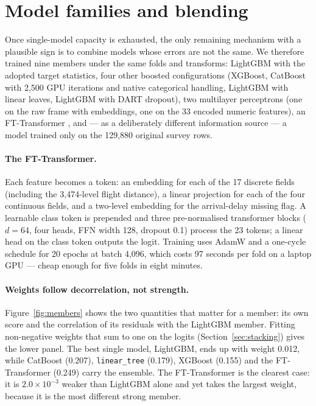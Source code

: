 \section{Model families and blending}
\label{sec:families}

Once single-model capacity is exhausted, the only remaining mechanism with a plausible sign is
to combine models whose errors are not the same. We therefore trained nine members under the
same folds and transforms: LightGBM with the adopted target statistics, four other boosted
configurations (XGBoost, CatBoost with 2{,}500 GPU iterations and native categorical handling,
LightGBM with linear leaves, LightGBM with DART dropout), two multilayer perceptrons (one on the
raw frame with embeddings, one on the 33 encoded numeric features), an FT-Transformer
\citep{gorishniy2021}, and --- as a deliberately different information source --- a model trained
only on the 129{,}880 original survey rows.

\paragraph{The FT-Transformer.} Each feature becomes a token: an embedding for each of the 17
discrete fields (including the 3{,}474-level flight distance), a linear projection for each of
the four continuous fields, and a two-level embedding for the arrival-delay missing flag.
A learnable class token is prepended and three pre-normalised transformer blocks
($d=64$, four heads, FFN width 128, dropout 0.1) process the 23 tokens; a linear head on the
class token outputs the logit. Training uses AdamW and a one-cycle schedule for 20 epochs at
batch 4{,}096, which costs 97 seconds per fold on a laptop GPU --- cheap enough for five folds
in eight minutes.

\paragraph{Weights follow decorrelation, not strength.} Figure~\ref{fig:members} shows the two
quantities that matter for a member: its own score and the correlation of its residuals with
the LightGBM member. Fitting non-negative weights that sum to one on the logits
(Section~\ref{sec:stacking}) gives the lower panel. The best single model, LightGBM, ends up
with weight 0.012, while CatBoost (0.207), \texttt{linear\_tree} (0.179), XGBoost (0.155) and
the FT-Transformer (0.249) carry the ensemble. The FT-Transformer is the clearest case: it is
$2.0\times10^{-3}$ weaker than LightGBM alone and yet takes the largest weight, because it is
the most different strong member.

